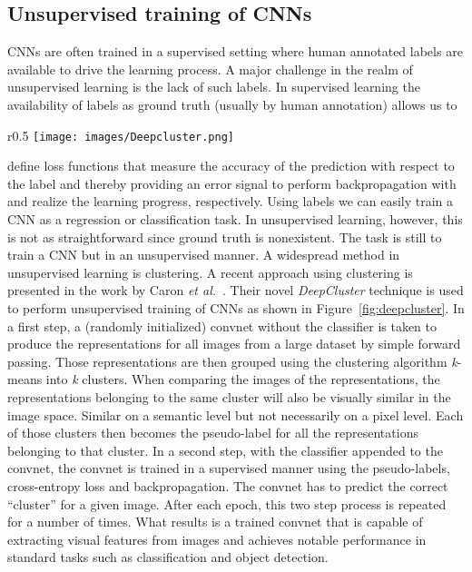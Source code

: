 \documentclass[a4paper,12pt]{report}
\begin{document}
\subsection{Unsupervised training of CNNs}\label{subsec:deepcluster}
CNNs are often trained in a supervised setting where human annotated labels are available to drive the learning process. A major challenge in the realm of unsupervised learning is the lack of such labels. In supervised learning the availability of labels as ground truth (usually by human annotation) allows us to
\begin{wrapfigure}{r}{0.5\textwidth}
\texttt{[image: images/Deepcluster.png]} 
\caption{DeepCluster unsupervised training of CNNs \cite{DeepCluster}.}
\label{fig:deepcluster}
\end{wrapfigure}
define loss functions that measure the accuracy of the prediction with respect to the label and thereby providing an error signal to perform backpropagation with and realize the learning progress, respectively. Using labels we can easily train a CNN as a regression or classification task. In unsupervised learning, however, this is not as straightforward since ground truth is nonexistent. The task is still to train a CNN but in an unsupervised manner. A widespread method in unsupervised learning is clustering. A recent approach using clustering is presented in the work by Caron \textit{et al.}~\cite{DeepCluster}. Their novel \textit{DeepCluster} technique is used to perform unsupervised training of CNNs as shown in Figure~\ref{fig:deepcluster}. In a first step, a (randomly initialized) convnet without the classifier is taken to produce the representations for all images from a large dataset by simple forward passing. Those representations are then grouped using the clustering algorithm \textit{k}-means into \textit{k} clusters. When comparing the images of the representations, the representations belonging to the same cluster will also be visually similar in the image space. Similar on a semantic level but not necessarily on a pixel level. Each of those clusters then becomes the pseudo-label for all the representations belonging to that cluster. In a second step, with the classifier appended to the convnet, the convnet is trained in a supervised manner using the pseudo-labels, cross-entropy loss and backpropagation. The convnet has to predict the correct ``cluster'' for a given image. After each epoch, this two step process is repeated for a number of times. What results is a trained convnet that is capable of extracting visual features from images and achieves notable performance in standard tasks such as classification and object detection.
\end{document}
